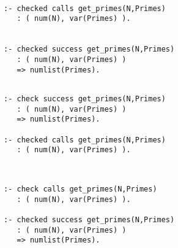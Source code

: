 \documentclass{article}
\author{claudio}
\date{\today}
\title{}
\begin{document}
\tableofcontents

\begin{verbatim}

:- checked calls get_primes(N,Primes)
   : ( num(N), var(Primes) ).


:- checked success get_primes(N,Primes)
   : ( num(N), var(Primes) )
   => numlist(Primes).

\end{verbatim}

\begin{verbatim}

:- check success get_primes(N,Primes)
   : ( num(N), var(Primes) )
   => numlist(Primes).

:- checked calls get_primes(N,Primes)
   : ( num(N), var(Primes) ).


\end{verbatim}


\begin{verbatim}

:- check calls get_primes(N,Primes)
   : ( num(N), var(Primes) ).

:- checked success get_primes(N,Primes)
   : ( num(N), var(Primes) )
   => numlist(Primes).

\end{verbatim}
\end{document}
